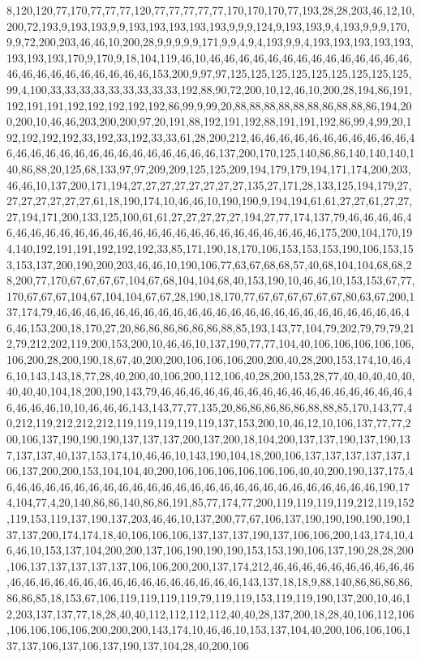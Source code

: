 8,120,120,77,170,77,77,77,120,77,77,77,77,77,170,170,170,77,193,28,28,203,46,12,10,200,72,193,9,193,193,9,9,193,193,193,193,193,9,9,9,124,9,193,193,9,4,193,9,9,9,170,9,9,72,200,203,46,46,10,200,28,9,9,9,9,9,171,9,9,4,9,4,193,9,9,4,193,193,193,193,193,193,193,193,170,9,170,9,18,104,119,46,10,46,46,46,46,46,46,46,46,46,46,46,46,46,46,46,46,46,46,46,46,46,46,46,46,153,200,9,97,97,125,125,125,125,125,125,125,125,125,99,4,100,33,33,33,33,33,33,33,33,33,192,88,90,72,200,10,12,46,10,200,28,194,86,191,192,191,191,192,192,192,192,192,86,99,9,99,20,88,88,88,88,88,88,86,88,88,86,194,200,200,10,46,46,203,200,200,97,20,191,88,192,191,192,88,191,191,192,86,99,4,99,20,192,192,192,192,33,192,33,192,33,33,61,28,200,212,46,46,46,46,46,46,46,46,46,46,46,46,46,46,46,46,46,46,46,46,46,46,46,46,46,46,137,200,170,125,140,86,86,140,140,140,140,86,88,20,125,68,133,97,97,209,209,125,125,209,194,179,179,194,171,174,200,203,46,46,10,137,200,171,194,27,27,27,27,27,27,27,27,135,27,171,28,133,125,194,179,27,27,27,27,27,27,27,61,18,190,174,10,46,46,10,190,190,9,194,194,61,61,27,27,61,27,27,27,194,171,200,133,125,100,61,61,27,27,27,27,27,194,27,77,174,137,79,46,46,46,46,46,46,46,46,46,46,46,46,46,46,46,46,46,46,46,46,46,46,46,46,46,46,175,200,104,170,194,140,192,191,191,192,192,192,33,85,171,190,18,170,106,153,153,153,190,106,153,153,153,137,200,190,200,203,46,46,10,190,106,77,63,67,68,68,57,40,68,104,104,68,68,28,200,77,170,67,67,67,67,104,67,68,104,104,68,40,153,190,10,46,46,10,153,153,67,77,170,67,67,67,104,67,104,104,67,67,28,190,18,170,77,67,67,67,67,67,67,80,63,67,200,137,174,79,46,46,46,46,46,46,46,46,46,46,46,46,46,46,46,46,46,46,46,46,46,46,46,46,46,46,153,200,18,170,27,20,86,86,86,86,86,86,88,85,193,143,77,104,79,202,79,79,79,212,79,212,202,119,200,153,200,10,46,46,10,137,190,77,77,104,40,106,106,106,106,106,106,200,28,200,190,18,67,40,200,200,106,106,106,200,200,40,28,200,153,174,10,46,46,10,143,143,18,77,28,40,200,40,106,200,112,106,40,28,200,153,28,77,40,40,40,40,40,40,40,40,104,18,200,190,143,79,46,46,46,46,46,46,46,46,46,46,46,46,46,46,46,46,46,46,46,46,46,10,10,46,46,46,143,143,77,77,135,20,86,86,86,86,86,88,88,85,170,143,77,40,212,119,212,212,212,119,119,119,119,119,137,153,200,10,46,12,10,106,137,77,77,200,106,137,190,190,190,137,137,137,200,137,200,18,104,200,137,137,190,137,190,137,137,137,40,137,153,174,10,46,46,10,143,190,104,18,200,106,137,137,137,137,137,106,137,200,200,153,104,104,40,200,106,106,106,106,106,106,40,40,200,190,137,175,46,46,46,46,46,46,46,46,46,46,46,46,46,46,46,46,46,46,46,46,46,46,46,46,46,46,190,174,104,77,4,20,140,86,86,140,86,86,191,85,77,174,77,200,119,119,119,119,212,119,152,119,153,119,137,190,137,203,46,46,10,137,200,77,67,106,137,190,190,190,190,190,137,137,200,174,174,18,40,106,106,106,137,137,137,190,137,106,106,200,143,174,10,46,46,10,153,137,104,200,200,137,106,190,190,190,153,153,190,106,137,190,28,28,200,106,137,137,137,137,137,106,106,200,200,137,174,212,46,46,46,46,46,46,46,46,46,46,46,46,46,46,46,46,46,46,46,46,46,46,46,46,46,46,143,137,18,18,9,88,140,86,86,86,86,86,86,85,18,153,67,106,119,119,119,119,79,119,119,153,119,119,190,137,200,10,46,12,203,137,137,77,18,28,40,40,112,112,112,112,40,40,28,137,200,18,28,40,106,112,106,106,106,106,106,200,200,200,143,174,10,46,46,10,153,137,104,40,200,106,106,106,137,137,106,137,106,137,190,137,104,28,40,200,106